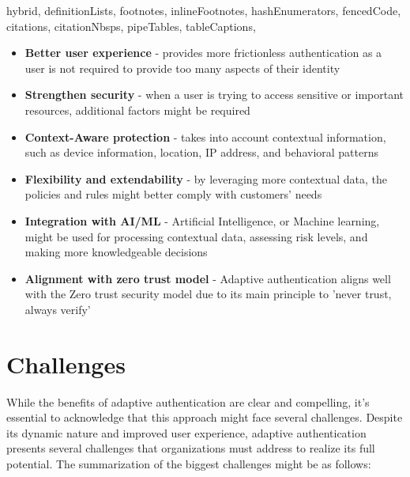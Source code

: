\documentclass[
  digital,     %
  oneside,     %
  nosansbold,  %
  nocolorbold, %
  lof,         %
  lot,         %
]{fithesis4}
\begin{document}
\begin{markdown*}{%
  hybrid,
  definitionLists,
  footnotes,
  inlineFootnotes,
  hashEnumerators,
  fencedCode,
  citations,
  citationNbsps,
  pipeTables,
  tableCaptions,
}
\begin{itemize}
    \item \textbf{Better user experience} - provides more frictionless authentication as a user is not required to provide too many aspects of their identity
    \item \textbf{Strengthen security} - when a user is trying to access sensitive or important resources, additional factors might be required
    \item \textbf{Context-Aware protection} - takes into account contextual information, such as device information, location, IP address, and behavioral patterns
    \item \textbf{Flexibility and extendability} - by leveraging more contextual data, the policies and rules might better comply with customers' needs
    \item \textbf{Integration with AI/ML} - Artificial Intelligence, or Machine learning, might be used for processing contextual data, assessing risk levels, and making more knowledgeable decisions
    \item \textbf{Alignment with zero trust model} - Adaptive authentication aligns well with the Zero trust security model due to its main principle to 'never trust, always verify' \cite{intro-incognia}
\end{itemize}

\newpage
\section{Challenges}
While the benefits of adaptive authentication are clear and compelling, it's essential to acknowledge that this approach might face several challenges.
Despite its dynamic nature and improved user experience, adaptive authentication presents several challenges that organizations must address to realize its full potential.
\newline
\newline
The summarization of the biggest challenges might be as follows:


\end{markdown*}
\end{document}
